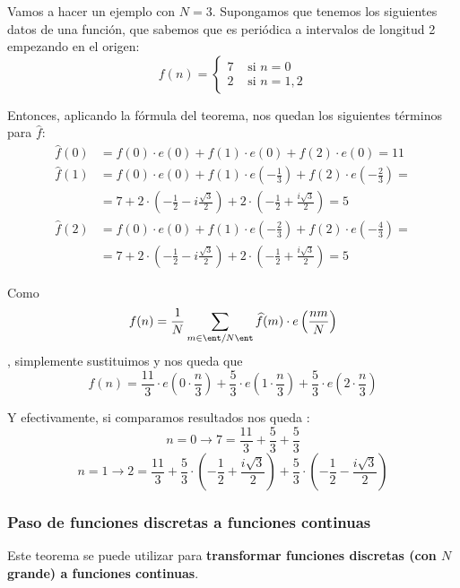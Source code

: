\begin{example}
	Vamos a hacer un ejemplo con $N=3$. Supongamos que tenemos los siguientes datos de una función, que sabemos que es periódica a intervalos de longitud 2 empezando en el origen:
	\[ f(n) = \begin{cases}
	7 &\text{ si } n= 0\\
	2 &\text{ si } n = 1 , 2
	\end{cases} \]

	Entonces, aplicando la fórmula del teorema, nos quedan los siguientes términos para $\hat{f}$:
	\begin{align*}
	\widehat{f}(0) &= f(0)\cdot e(0) + f(1)\cdot e(0) + f(2) \cdot e(0) = 11 \\
	\widehat{f}(1) &= f(0)\cdot e(0) + f(1)\cdot e\left(-\frac{1}{3}\right) + f(2)\cdot e\left(-\frac{2}{3}\right) = \\
		&= 7 + 2\cdot\left(-\frac{1}{2} -i\frac{\sqrt{3}}{2}\right) + 2\cdot \left(-\frac{1}{2} + \frac{i\sqrt{3}}{2}\right) = 5 \\
	\widehat{f}(2) &= f(0)\cdot e(0) + f(1)\cdot e\left(- \frac{2}{3}\right) + f(2) \cdot e\left(-\frac{4}{3}\right) = \\
		&= 7 + 2\cdot\left(-\frac{1}{2} -i\frac{\sqrt{3}}{2}\right) + 2\cdot \left(-\frac{1}{2} + \frac{i\sqrt{3}}{2}\right) = 5
	\end{align*}

	Como \[ f(n) = \frac{1}{N} \sum_{m\in \ent/ N\ent} \widehat{f}(m) \cdot e\left(\frac{nm}{N}\right) \], simplemente sustituimos y nos queda que \[
	f(n) = \frac{11}{3}\cdot e\left(0 \cdot \frac{n}{3}\right) + \frac{5}{3}\cdot e\left(1 \cdot \frac{n}{3}\right) + \frac{5}{3} \cdot e\left(2 \cdot \frac{n}{3}\right) \]

	Y efectivamente, si comparamos resultados nos queda :
	$$n = 0 \rightarrow 7 = \frac{11}{3} + \frac{5}{3} + \frac{5}{3}$$
	$$n = 1 \rightarrow 2 = \frac{11}{3} + \frac{5}{3} \cdot \left(- \frac{1}{2} + \frac{i \sqrt{3}}{2}\right) + \frac{5}{3} \cdot \left(- \frac{1}{2} -\frac{i \sqrt{3}}{2}\right)$$
\end{example}

\subsubsection{Paso de funciones discretas a funciones continuas}

Este teorema se puede utilizar para \textbf{transformar funciones discretas (con $N$ grande) a funciones continuas}.

